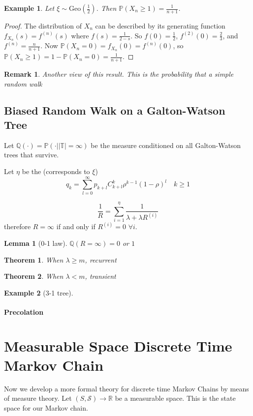 \documentclass{article}
\newtheorem{Thm}{Theorem}[section]
\newtheorem{Lem}{Lemma}[section]
\newtheorem{Eg}{Example}[section]
\newtheorem*{Rk}{Remark}
\theoremstyle{definition}
\newcommand{\PP}{\mathbb{P}}
\newcommand{\QQ}{\mathbb{Q}}
\newcommand{\TT}{\mathbb{T}}
\renewcommand{\geq}{\geqslant}
\newcommand{\<}{\left\langle}
\renewcommand{\>}{\right\rangle}
\begin{document}
\begin{Eg}
    Let $\xi\sim\text{Geo}(\frac{1}{2})$. Then $\PP(X_n \geq 1)=\frac{1}{n+1}$.
\end{Eg}
\begin{proof}
    The distribution of $X_n$ can be described by its generating function $f_{X_n}(s)=f^{(n)}(s)$
    where $f(s)=\frac{1}{2-s}$. So $f(0)=\frac{1}{2}$, $f^{(2)}(0)=\frac{2}{3}$, and $f^{(n)}=\frac{n}{n+1}$.
    Now $\PP(X_n=0)=f_{X_n}(0)=f^{(n)}(0)$, so $\PP(X_n \geq 1)=1-\PP(X_n = 0)=\frac{1}{n+1}$.
\end{proof}
\begin{Rk}
    Another view of this result.
    This is the probability that a simple random walk 
\end{Rk}

\subsection{Biased Random Walk on a Galton-Watson Tree}
Let $\QQ(\cdot)=\PP(\cdot||\TT|=\infty)$ be the measure conditioned on all Galton-Watson trees that survive.

Let $\eta$ be the (corresponds to $\xi$)
\[q_k=\sum_{l=0}^{\infty} p_{k+l} C_{k+l}^k \rho^{k-1}(1-\rho)^l \quad k\geq 1 \]


\[\frac{1}{R}=\sum_{i=1}^{\eta}\frac{1}{\lambda+\lambda R^{(i)}}\]
therefore $R=\infty$ if and only if $R^{(i)}=0$ $\forall i$.

\begin{Lem}[0-1 law]
    $\QQ(R=\infty)=0$ or $1$
\end{Lem}

\begin{Thm}
    When $\lambda\geq m$, recurrent
\end{Thm}



\begin{Thm}
    When $\lambda<m$, transient
\end{Thm}

\begin{Eg}[3-1 tree]
    
\end{Eg}

\paragraph{Precolation}

\section{Measurable Space Discrete Time Markov Chain}
Now we develop a more formal theory for discrete time Markov Chains by means of measure theory.
Let $(S,\mathcal{S})\to\mathbb{R}$ be a measurable space. This is the state space for our Markov chain.
\end{document}

